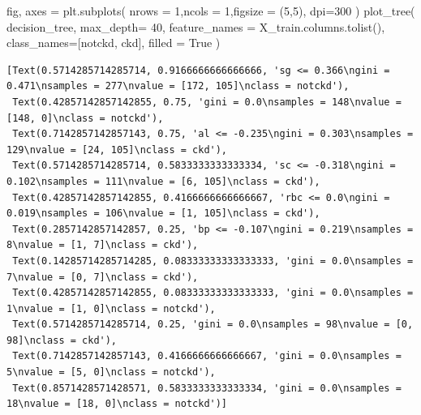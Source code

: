 \documentclass[
  11pt,
  letterpaper,
  DIV=11,
  numbers=noendperiod]{scrartcl}
\newenvironment{Shaded}{\begin{snugshade}}{\end{snugshade}}
\newcommand{\DecValTok}[1]{\textcolor[rgb]{0.68,0.00,0.00}{#1}}
\newcommand{\NormalTok}[1]{\textcolor[rgb]{0.00,0.23,0.31}{#1}}
\newcommand{\OperatorTok}[1]{\textcolor[rgb]{0.37,0.37,0.37}{#1}}
\newcommand{\StringTok}[1]{\textcolor[rgb]{0.13,0.47,0.30}{#1}}
\newcommand{\VariableTok}[1]{\textcolor[rgb]{0.07,0.07,0.07}{#1}}
\begin{document}
\begin{Shaded}
\begin{Highlighting}[]
\NormalTok{fig, axes }\OperatorTok{=}\NormalTok{ plt.subplots(}
\NormalTok{    nrows }\OperatorTok{=} \DecValTok{1}\NormalTok{,ncols }\OperatorTok{=} \DecValTok{1}\NormalTok{,figsize }\OperatorTok{=}\NormalTok{ (}\DecValTok{5}\NormalTok{,}\DecValTok{5}\NormalTok{), dpi}\OperatorTok{=}\DecValTok{300}
\NormalTok{    )}
\NormalTok{plot\_tree(}
\NormalTok{    decision\_tree, }
\NormalTok{    max\_depth}\OperatorTok{=} \DecValTok{40}\NormalTok{, }
\NormalTok{    feature\_names }\OperatorTok{=}\NormalTok{ X\_train.columns.tolist(), }
\NormalTok{    class\_names}\OperatorTok{=}\NormalTok{[}\StringTok{\textquotesingle{}notckd\textquotesingle{}}\NormalTok{, }\StringTok{\textquotesingle{}ckd\textquotesingle{}}\NormalTok{],}
\NormalTok{    filled }\OperatorTok{=} \VariableTok{True}
\NormalTok{)}
\end{Highlighting}
\end{Shaded}

\begin{verbatim}
[Text(0.5714285714285714, 0.9166666666666666, 'sg <= 0.366\ngini = 0.471\nsamples = 277\nvalue = [172, 105]\nclass = notckd'),
 Text(0.42857142857142855, 0.75, 'gini = 0.0\nsamples = 148\nvalue = [148, 0]\nclass = notckd'),
 Text(0.7142857142857143, 0.75, 'al <= -0.235\ngini = 0.303\nsamples = 129\nvalue = [24, 105]\nclass = ckd'),
 Text(0.5714285714285714, 0.5833333333333334, 'sc <= -0.318\ngini = 0.102\nsamples = 111\nvalue = [6, 105]\nclass = ckd'),
 Text(0.42857142857142855, 0.4166666666666667, 'rbc <= 0.0\ngini = 0.019\nsamples = 106\nvalue = [1, 105]\nclass = ckd'),
 Text(0.2857142857142857, 0.25, 'bp <= -0.107\ngini = 0.219\nsamples = 8\nvalue = [1, 7]\nclass = ckd'),
 Text(0.14285714285714285, 0.08333333333333333, 'gini = 0.0\nsamples = 7\nvalue = [0, 7]\nclass = ckd'),
 Text(0.42857142857142855, 0.08333333333333333, 'gini = 0.0\nsamples = 1\nvalue = [1, 0]\nclass = notckd'),
 Text(0.5714285714285714, 0.25, 'gini = 0.0\nsamples = 98\nvalue = [0, 98]\nclass = ckd'),
 Text(0.7142857142857143, 0.4166666666666667, 'gini = 0.0\nsamples = 5\nvalue = [5, 0]\nclass = notckd'),
 Text(0.8571428571428571, 0.5833333333333334, 'gini = 0.0\nsamples = 18\nvalue = [18, 0]\nclass = notckd')]
\end{verbatim}
\end{document}
